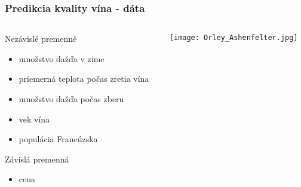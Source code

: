 \documentclass[presentation.tex]{subfiles}
\begin{document}
	
	\begin{frame}
		\frametitle{Predikcia kvality vína - dáta}
		
		\begin{columns}
			\begin{column}{0.7\textwidth}
				Nezávislé premenné
				\begin{itemize}
					\item množstvo dažďa v zime
					\item priemerná teplota počas zretia vína
					\item množstvo dažďa počas zberu
					\item vek vína
					\item populácia Francúzska
				\end{itemize}
				Závislá premenná
				\begin{itemize}
					\item cena
				\end{itemize}
			\end{column}
			
			\begin{column}{0.3\textwidth}
				\centering
				\texttt{[image: Orley\_Ashenfelter.jpg]}
			\end{column}
			
		\end{columns}
		
	\end{frame}
\end{document}
